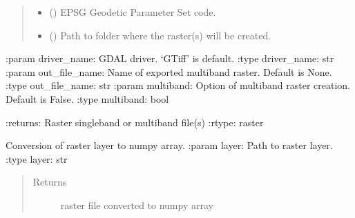 \documentclass[letterpaper,10pt,english]{sphinxmanual}
\begin{document}
\begin{fulllineitems}
\begin{quote}
\begin{description}
\begin{itemize}
\item {} 
 () \textendash{} EPSG Geodetic Parameter Set code.

\item {} 
 () \textendash{} Path to folder where the raster(s) will be created.

\end{itemize}

\end{description}\end{quote}

:param driver\_name: GDAL driver. ‘GTiff’ is default.
:type driver\_name: str
:param out\_file\_name: Name of exported multiband raster. Default is None.
:type out\_file\_name: str
:param multiband: Option of multiband raster creation. Default is False.
:type multiband: bool

:returns: Raster singleband or multiband file(s)
:rtype: raster

\end{fulllineitems}


\begin{fulllineitems}
\label{\detokenize{libs:hydrIO.rasterToArray}}
Conversion of raster layer to numpy array.
:param layer: Path to raster layer.
:type layer: str
\begin{quote}\begin{description}
\item[{Returns}] \leavevmode
raster file converted to numpy array

\end{description}\end{quote}

\end{fulllineitems}

\end{document}
